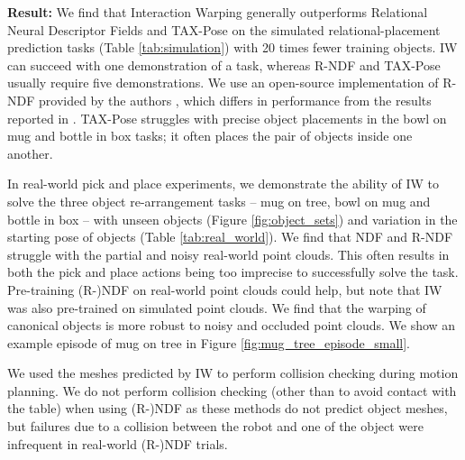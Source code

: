 \documentclass{article}
\newcommand{\ob}[1]{\textcolor{purple}{[\textbf{OB:} #1]}}
\begin{document}
\textbf{Result:} We find that Interaction Warping generally outperforms Relational Neural Descriptor Fields \cite{simeonov2022neural} and TAX-Pose \cite{pan22taxpose} on the simulated relational-placement prediction tasks (Table \ref{tab:simulation}) with 20 times fewer training objects. IW can succeed with one demonstration of a task, whereas R-NDF and TAX-Pose usually require five demonstrations. We use an open-source implementation of R-NDF provided by the authors \cite{rndfgithub}, which differs in performance from the results reported in \cite{simeonov22se}. TAX-Pose struggles with precise object placements in the bowl on mug and bottle in box tasks; it often places the pair of objects inside one another.

In real-world pick and place experiments, we demonstrate the ability of IW to solve the three object re-arrangement tasks -- mug on tree, bowl on mug and bottle in box -- with unseen objects (Figure \ref{fig:object_sets}) and variation in the starting pose of objects (Table \ref{tab:real_world}). We find that NDF and R-NDF \cite{simeonov22neural,simeonov22se} struggle with the partial and noisy real-world point clouds. This often results in both the pick and place actions being too imprecise to successfully solve the task. Pre-training (R-)NDF on real-world point clouds could help, but note that IW was also pre-trained on simulated point clouds. We find that the warping of canonical objects is more robust to noisy and occluded point clouds. We show an example episode of mug on tree in Figure \ref{fig:mug_tree_episode_small}.

We used the meshes predicted by IW to perform collision checking during motion planning. We do not perform collision checking (other than to avoid contact with the table) when using (R-)NDF as these methods do not predict object meshes, but failures due to a collision between the robot and one of the object were infrequent in real-world (R-)NDF trials.

\end{document}
